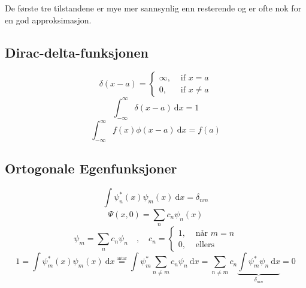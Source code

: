 De første tre tilstandene er mye mer sannsynlig enn resterende og er ofte nok for en god approksimasjon. 


\subsection*{Dirac-delta-funksjonen}
\[
δ(x-a) = 
\begin{cases}
  ∞, &\text{ if }x = a\\
  0, &\text{ if }x ≠  a 
\end{cases}
\]
\[
∫_{-∞}^{∞} δ(x-a) \ \mathrm{d}x = 1
\]
\[
∫_{-∞}^{∞} f(x) ϕ(x-a) \ \mathrm{d}x = f(a)
\]
\subsection*{Ortogonale Egenfunksjoner}
\[
∫ ψ_n^{*}(x) ψ_m(x) \ \mathrm{d}x = δ_{nm}
\]
\[
Ψ(x,0) = ∑_{n}^{} c_n ψ_n(x)
\]
\[
ψ_m = ∑_{n}^{} c_n ψ_n \quad , \quad c_n = \begin{cases}
  1, &\text{ når }m = n\\
  0, &\text{ ellers }
\end{cases}
\]
\[
1 = ∫ ψ_m^{*}(x) ψ_m(x) \ \mathrm{d}x \overset{\underset{\text{antar}}{}}{=} ∫ ψ_m^{*} ∑_{n ≠ m}^{} c_n ψ_n \ \mathrm{d}x = ∑_{n ≠ m}^{} c_n \underbrace{∫ ψ_m^{*}ψ_n \ \mathrm{d}x}_{δ_{mn}} = 0
\]
